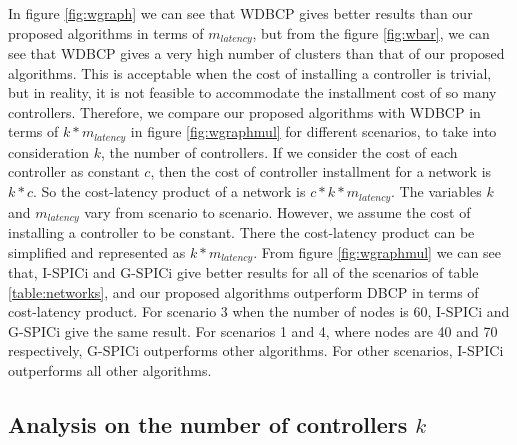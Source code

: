 \documentclass[times]{dacauth}
\begin{document}
In figure \ref{fig:wgraph} we can see that WDBCP gives better results than our proposed algorithms in terms of $m_{latency}$, but from the figure \ref{fig:wbar}, we can see that WDBCP gives a very high number of clusters than that of our proposed algorithms. This is acceptable when the cost of installing a controller is trivial, but in reality, it is not feasible to accommodate the installment cost of so many controllers. Therefore, we compare our proposed algorithms with WDBCP in terms of $k*m_{latency}$ in figure \ref{fig:wgraphmul} for different scenarios, to take into consideration $k$, the number of controllers. If we consider the cost of each controller as constant $c$, then the cost of controller installment for a network is $k*c$. So the cost-latency product of a network is $c*k*m_{latency}$. The variables $k$ and $m_{latency}$ vary from scenario to scenario. However, we assume the cost of installing a controller to be constant. There the cost-latency product can be simplified and represented as $k*m_{latency}$.
From figure \ref{fig:wgraphmul} we can see that, I-SPICi and G-SPICi give better results for all of the scenarios of table \ref{table:networks}, and our proposed algorithms outperform DBCP in terms of cost-latency product. For scenario 3 when the number of nodes is 60, I-SPICi and G-SPICi give the same result. For scenarios 1 and 4, where nodes are 40 and 70 respectively, G-SPICi outperforms other algorithms. For other scenarios, I-SPICi outperforms all other algorithms.

\subsection{Analysis on the number of controllers $k$}
	
\end{document}
